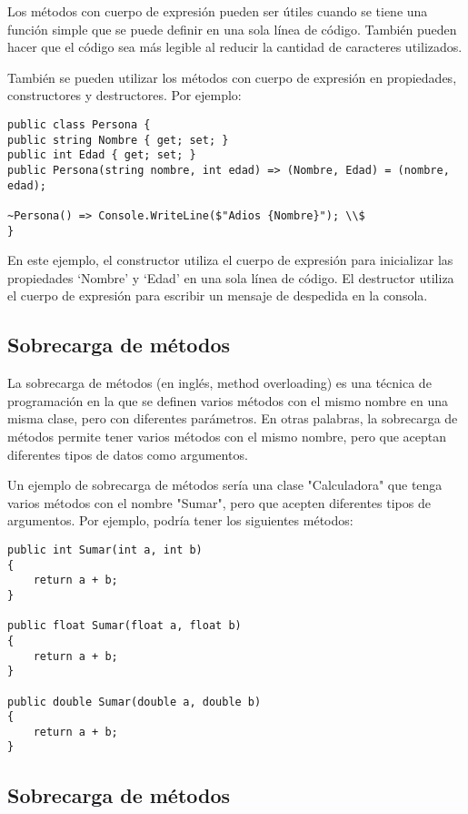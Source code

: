 \documentclass[executivepaper]{article}
\begin{document}
Los métodos con cuerpo de expresión pueden ser útiles cuando se tiene una función simple que se puede definir en una sola línea de código. También pueden hacer que el código sea más legible al reducir la cantidad de caracteres utilizados.

También se pueden utilizar los métodos con cuerpo de expresión en propiedades, constructores y destructores. Por ejemplo:

\begin{lstlisting}
public class Persona {
public string Nombre { get; set; }
public int Edad { get; set; }
public Persona(string nombre, int edad) => (Nombre, Edad) = (nombre, edad);

~Persona() => Console.WriteLine($"Adios {Nombre}"); \\$
}
\end{lstlisting}

En este ejemplo, el constructor utiliza el cuerpo de expresión para inicializar las propiedades \enquote*{Nombre} y \enquote*{Edad} en una sola línea de código. El destructor utiliza el cuerpo de expresión para escribir un mensaje de despedida en la consola.

\subsection{Sobrecarga de métodos}

La sobrecarga de métodos (en inglés, method overloading) es una técnica de programación en la que se definen varios métodos con el mismo nombre en una misma clase, pero con diferentes parámetros. En otras palabras, la sobrecarga de métodos permite tener varios métodos con el mismo nombre, pero que aceptan diferentes tipos de datos como argumentos.

Un ejemplo de sobrecarga de métodos sería una clase "Calculadora" que tenga varios métodos con el nombre "Sumar", pero que acepten diferentes tipos de argumentos. Por ejemplo, podría tener los siguientes métodos:

\begin{lstlisting}
public int Sumar(int a, int b)
{
    return a + b;
}

public float Sumar(float a, float b)
{
    return a + b;
}

public double Sumar(double a, double b)
{
    return a + b;
}
\end{lstlisting}

\subsection{Sobrecarga de métodos}
\end{document}

